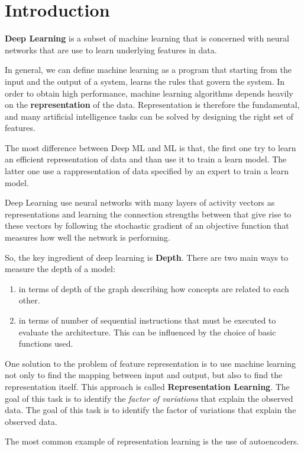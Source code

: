 \chapter*{Introduction}
\textbf{Deep Learning} is a subset of machine learning that is concerned with 
neural networks that are use to learn underlying features in data.

In general, we can define machine learning as a program that starting from the 
input and the output of a system, learns the rules that govern the system. In 
order to obtain high performance, machine learning algorithms depends heavily on 
the \textbf{representation} of the data. Representation is therefore the fundamental, 
and many artificial intelligence tasks can be solved by designing the right set of features.

The most difference between Deep ML and ML is that, the first one try to learn an
efficient representation of data and than use it to train a learn model. The latter 
one use a rappresentation of data specified by an expert to train a learn model.

Deep Learning use neural networks with many layers of activity vectors as 
representations and learning the connection strengths between that give rise to 
these vectors by following the stochastic gradient of an objective function that
measures how well the network is performing.

So, the key ingredient of deep learning is \textbf{Depth}. There are two main 
ways to measure the depth of a model:
\begin{enumerate}
    \item in terms of depth of the graph describing how concepts are related to
        each other.
    \item in terms of number of sequential instructions that must be executed to 
        evaluate the architecture. This can be influenced by the choice of basic 
        functions used.
\end{enumerate}

One solution to the problem of feature representation is to use machine learning
not only to find the mapping between input and output, but also to find the
representation itself. This approach is called \textbf{Representation Learning}.
The goal of this task is to identify the \textit{factor of variations} that 
explain the observed data. The goal of this task is to identify the factor of 
variations that explain the observed data.

The most common example of representation learning is the use of autoencoders.

